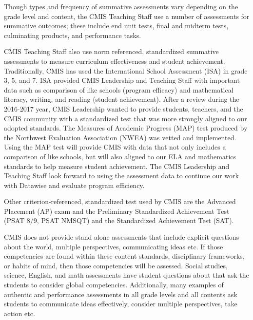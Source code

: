 \begin{findings}
Though types and frequency of summative assessments vary depending on the grade level and content, the CMIS Teaching Staff use a number of assessments for summative outcomes; these include end unit tests, final and midterm tests, culminating products, and performance tasks. 

 
CMIS Teaching Staff also use norm referenced, standardized summative assessments to measure curriculum effectiveness and student achievement. Traditionally, CMIS has used the International School Assessment (ISA) in grade 3, 5, and 7. ISA provided CMIS Leadership and Teaching Staff with important data such as comparison of like schools (program efficacy) and mathematical literacy, writing, and reading (student achievement). After a review during the 2016-2017 year, CMIS Leadership wanted to provide students, teachers, and the CMIS community with a standardized test that was more strongly aligned to our adopted standards. The Measures of Academic Progress (MAP) test produced by the Northwest Evaluation Association (NWEA) was vetted and implemented. Using the MAP test will provide CMIS with data that not only includes a comparison of like schools, but will also aligned to our ELA and mathematics standards to help measure student achievement. The CMIS Leadership and Teaching Staff look forward to using the assessment data to continue our work with Datawise and evaluate program efficiency. 

Other criterion-referenced, standardized test used by CMIS are the Advanced Placement (AP) exam and the Preliminary Standardized Achievement Test (PSAT 8/9, PSAT NMSQT) and the Standardized Achievement Test (SAT).
  

CMIS does not provide stand alone assessments that include explicit questions about  the world, multiple perspectives, communicating ideas etc. If those competencies are found within these content standards,  disciplinary frameworks, or habits of mind, then those competencies will be assessed. Social studies, science, English, and math assessments have student questions about that ask the students to consider global competencies. Additionally, many examples of authentic and performance assessments in all grade levels and all contents ask students to communicate ideas effectively, consider multiple perspectives, take action etc. 



\end{findings}

